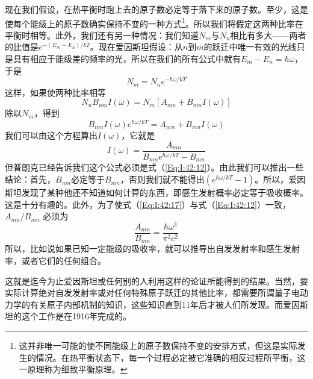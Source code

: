 现在我们假设，在热平衡时跑上去的原子数必定等于落下来的原子数。至少，这是使每个能级上的原子数确实保持不变的一种方式\footnote{这并非唯一可能的使不同能级上的原子数保持不变的安排方式，但这是实际发生的情况。在热平衡状态下，每一个过程必定被它准确的相反过程所平衡，这一原理称为细致平衡原理。}。所以我们将假定这两种比率在平衡时相等。此外，我们还有另一种情况：我们知道$N_m$与$N_n$相比有多大——两者的比值是$e^{-(E_m-E_n)/kT}$。现在爱因斯坦假设：从$n$到$m$的跃迁中唯一有效的光线只是具有相应于能级差的频率的光，所以在我们的所有公式中就有$E_m-E_n=\hbar\omega$，于是
\begin{equation}
    \label{Eq:I:42:15}
    N_m=N_ne^{-\hbar\omega/kT}
\end{equation}
这样，如果使两种比率相等
\begin{equation*}
    N_n B_{nm} I(\omega)=N_m [A_{mn} +B_{mn}I(\omega)]
\end{equation*}
除以$N_m$，得到
\begin{equation}
    \label{Eq:I:42:16}
    B_{nm} I(\omega)e^{\hbar\omega/kT}=A_{mn} +B_{mn}I(\omega)
\end{equation}
我们可以由这个方程算出$I(\omega)$，它就是
\begin{equation}
    \label{Eq:I:42:17}
    I(\omega)=\frac{A_{mn}}{B_{nm}e^{\hbar\omega/kT}-B_{mn}}
\end{equation}
但普朗克已经告诉我们这个公式必须是式（\ref{Eq:I:42:12}）。由此我们可以推出一些结论：首先，$B_{nm}$必定等于$B_{mn}$，否则我们就不能得出$(e^{\hbar\omega/kT}-1)$。所以，爱因斯坦发现了某种他还不知道如何计算的东西，即感生发射概率必定等于吸收概率。这是十分有趣的。此外，为了使式（\ref{Eq:I:42:17}）与式（\ref{Eq:I:42:12}）一致，$A_{mn} /B_{mn}$ 必须为 
\begin{equation}
    \label{Eq:I:42:18}
    \frac{A_{mn}}{B_{mn}}=\frac{\hbar\omega^3}{\pi^2c^2}
\end{equation}
所以，比如说如果已知一定能级的吸收率，就可以推导出自发发射率和感生发射率，或者它们的任何组合。

这就是迄今为止爱因斯坦或任何别的人利用这样的论证所能得到的结果。当然，要实际计算绝对自发发射率或对任何特殊原子跃迁的其他比率，都需要所谓量子电动力学的有关原子内部机制的知识，这些知识直到11年后才被人们所发现。而爱因斯坦的这个工作是在1916年完成的。

